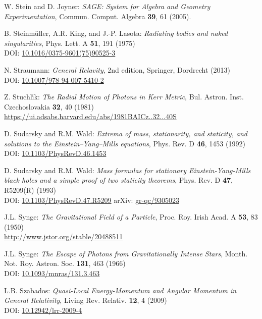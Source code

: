\begin{thebibliography}{123}
W. Stein and D. Joyner: {\em SAGE: System for Algebra and Geometry Experimentation},
Commun. Comput. Algebra {\bf 39}, 61 (2005).

B. Steinmüller, A.R. King, and J.-P. Lasota:
{\em Radiating bodies and naked singularities},
Phys. Lett. A {\bf 51}, 191 (1975)\\
DOI: \href{https://doi.org/10.1016/0375-9601(75)90525-3}{10.1016/0375-9601(75)90525-3}

N. Straumann: \emph{General Relavity}, 2nd edition,
Springer, Dordrecht (2013)\\
DOI: \href{https://doi.org/10.1007/978-94-007-5410-2}{10.1007/978-94-007-5410-2}

Z. Stuchl\'{\i}k: {\em The Radial Motion of Photons in Kerr Metric},
Bul. Astron. Inst. Czechoslovakia {\bf 32}, 40 (1981)\\
\url{https://ui.adsabs.harvard.edu/abs/1981BAICz..32...40S}

D. Sudarsky and R.M. Wald: {\em Extrema of mass, stationarity, and staticity,
and solutions to the Einstein–Yang–Mills equations},
Phys. Rev. D {\bf 46}, 1453 (1992)\\
DOI: \href{https://doi.org/10.1103/PhysRevD.46.1453}{10.1103/PhysRevD.46.1453}

D. Sudarsky and R.M. Wald:
{\em Mass formulas for stationary Einstein-Yang-Mills black holes and a simple proof of two staticity theorems},
Phys. Rev. D {\bf 47}, R5209(R) (1993)\\
DOI: \href{https://doi.org/10.1103/PhysRevD.47.R5209}{10.1103/PhysRevD.47.R5209}\hfill
arXiv: \href{https://arxiv.org/abs/gr-qc/9305023}{gr-qc/9305023}

J.L. Synge: {\em The Gravitational Field of a Particle},
Proc. Roy. Irish Acad. A {\bf 53}, 83 (1950)\\
\url{http://www.jstor.org/stable/20488511}

J.L. Synge: {\em The Escape of Photons from Gravitationally Intense Stars},
Month. Not. Roy. Astron. Soc. {\bf 131}, 463 (1966)\\
DOI: \href{https://doi.org/10.1093/mnras/131.3.463}{10.1093/mnras/131.3.463}

L.B. Szabados:
{\em Quasi-Local Energy-Momentum and Angular Momentum in General Relativity},
Living Rev. Relativ. {\bf 12}, 4 (2009)\\
DOI: \href{https://doi.org/10.12942/lrr-2009-4}{10.12942/lrr-2009-4}


\end{thebibliography}
